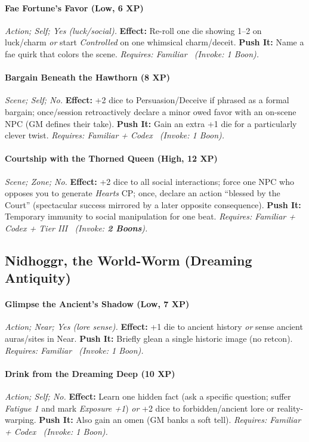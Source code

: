 \documentclass[12pt,twoside]{book}
\begin{document}
\paragraph{Fae Fortune’s Favor (Low, 6 XP)} \emph{Action; Self; Yes (luck/social).}
\textbf{Effect:} Re-roll one die showing 1–2 on luck/charm \emph{or} start \emph{Controlled} on one whimsical charm/deceit.
\textbf{Push It:} Name a fae quirk that colors the scene.
\emph{Requires: Familiar \ (\textit{Invoke:} 1 Boon).}
\paragraph{Bargain Beneath the Hawthorn (8 XP)} \emph{Scene; Self; No.}
\textbf{Effect:} +2 dice to Persuasion/Deceive if phrased as a formal bargain; once/session retroactively declare a minor owed favor with an on-scene NPC (GM defines their take).
\textbf{Push It:} Gain an extra +1 die for a particularly clever twist.
\emph{Requires: Familiar + Codex \ (\textit{Invoke:} 1 Boon).}
\paragraph{Courtship with the Thorned Queen (High, 12 XP)} \emph{Scene; Zone; No.}
\textbf{Effect:} +2 dice to all social interactions; force one NPC who opposes you to generate \emph{Hearts} CP; once, declare an action ``blessed by the Court'' (spectacular success mirrored by a later opposite consequence).
\textbf{Push It:} Temporary immunity to social manipulation for one beat.
\emph{Requires: Familiar + Codex + Tier III \ (\textit{Invoke:} \textbf{2 Boons}).}

\subsection{Nidhoggr, the World-Worm (Dreaming Antiquity)}
\paragraph{Glimpse the Ancient’s Shadow (Low, 7 XP)} \emph{Action; Near; Yes (lore sense).}
\textbf{Effect:} +1 die to ancient history \emph{or} sense ancient auras/sites in Near.
\textbf{Push It:} Briefly glean a single historic image (no retcon).
\emph{Requires: Familiar \ (\textit{Invoke:} 1 Boon).}
\paragraph{Drink from the Dreaming Deep (10 XP)} \emph{Action; Self; No.}
\textbf{Effect:} Learn one hidden fact (ask a specific question; suffer \emph{Fatigue 1} and mark \emph{Exposure +1}) \emph{or} +2 dice to forbidden/ancient lore or reality-warping.
\textbf{Push It:} Also gain an omen (GM banks a soft tell).
\emph{Requires: Familiar + Codex \ (\textit{Invoke:} 1 Boon).}
\end{document}
